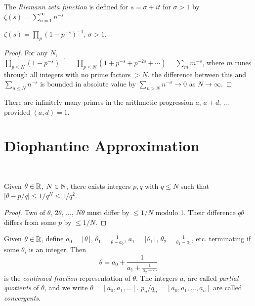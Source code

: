 \documentclass[a4paper, 10pt, twocolumn]{amsart}
\begin{document}
\begin{definition}
    The \emph{Riemann zeta function} is defined for $s = \sigma + it$ for $\sigma > 1$ by
        $\zeta(s) = \sum_{n = 1}^\infty n^{-s}$.
\end{definition}

\begin{theorem}
$\zeta(s) = \prod_p (1 - p^{-s})^{-1}$, $\sigma > 1$.
\end{theorem}
\begin{proof}
    For any $N$, $\prod_{p \leq N} (1 - p^{-s})^{-1} = \prod_{p \leq N} (1 + p^{-s}+ p^{-2s} + \cdots) = \sum_m m^{-s}$, where $m$ runes through all integers with no prime factors $> N$. the difference between this and $\sum_{n \leq N} n^{-s}$ is bounded in absolute value by $\sum_{n > N} n^{-\sigma} \rightarrow 0$ as $N \rightarrow \infty$.
\end{proof}

\begin{theorem}
There are infinitely many primes in the arithmetic progression $a$, $a + d$, $\dots$ provided $(a, d) = 1$.   
\end{theorem}

\section{Diophantine Approximation}
\ 

\begin{theorem}[Dirichlet]
Given $\theta \in \mathbb{R}$, $N \in \mathbb{N}$, there exists integers $p, q$ with $q \leq N$ such that $|\theta - p/q| \leq 1/q^N \leq 1/q^2$.
\end{theorem}
\begin{proof}
    Two of $\theta$, $2\theta$, $\dots$, $N\theta$ must differ by $\leq 1/N$ modulo 1. Their difference $q \theta$ differs from some $p$ by $\leq 1/N$.
\end{proof}

\begin{definition}
    Given $\theta \in \mathbb{R}$, define $a_0 = \lfloor \theta \rfloor$, $\theta_1 = \frac{1}{\theta - a_0}$, $a_1 = \lfloor \theta_1 \rfloor$, $\theta_2 = \frac{1}{\theta_1 - a_1}$, etc. terminating if some $\theta_i$ is an integer. Then
    $$
    \theta = a_0 + \frac{1}{a_1 + \frac{1}{a_2 +\cdots}}
    $$
    is the \emph{continued fraction} representation of $\theta$. The integers $a_i$ are called \emph{partial quotients} of $\theta$, and we write $\theta = [a_0, a_1, \dots]$. $p_n/q_n = [a_0, a_1, \dots, a_n]$ are called \emph{convergents}.
\end{definition}
\end{document}
